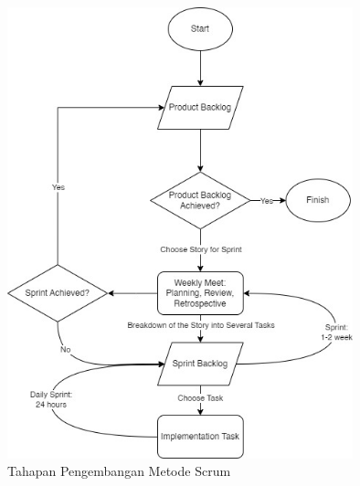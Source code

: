 \begin{figure}[H]
	\centering
	\includegraphics[keepaspectratio, width=10cm]{gambar/metode_scrum}
	\caption{Tahapan Pengembangan Metode Scrum}
	\label{gambar:scrum}
\end{figure}

